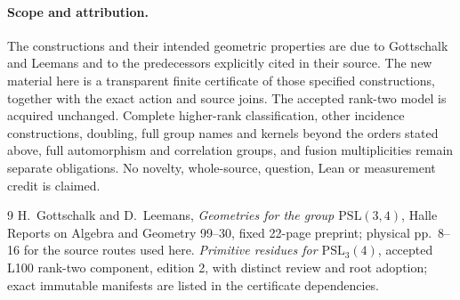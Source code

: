 \documentclass[11pt]{article}
\begin{document}
\paragraph{Scope and attribution.}
The constructions and their intended geometric properties are due to
Gottschalk and Leemans and to the predecessors explicitly cited in their
source. The new material here is a transparent finite certificate of those
specified constructions, together with the exact action and source joins.
The accepted rank-two model is acquired unchanged. Complete higher-rank
classification, other incidence constructions, doubling, full group names
and kernels beyond the orders stated above, full automorphism and
correlation groups, and fusion multiplicities remain separate obligations.
No novelty, whole-source, question, Lean or measurement credit is claimed.

\begin{thebibliography}{9}
 H.~Gottschalk and D.~Leemans, \emph{Geometries for the group
$\mathrm{PSL}(3,4)$}, Halle Reports on Algebra and Geometry 99--30,
fixed 22-page preprint; physical pp.~8--16 for the source routes used here.
 \emph{Primitive residues for $\mathrm{PSL}_3(4)$}, accepted
L100 rank-two component, edition 2, with distinct review and root adoption;
exact immutable manifests are listed in the certificate dependencies.
\end{thebibliography}
\end{document}
